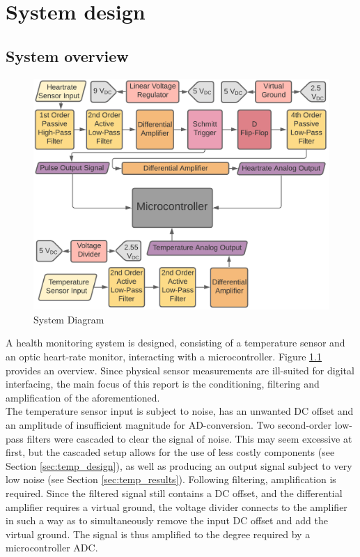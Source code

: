 
\chapter{System design}
	\section{System overview} \label{sec:system}

\begin{figure}[h]
    \centering
    \vspace{-0.5cm}
    \includegraphics[width = 1\textwidth]{Figures/overview}
    \caption{System Diagram}
    \label{fig:overview}
\end{figure}

A health monitoring system is designed, consisting of a temperature sensor and an optic heart-rate monitor, interacting with a microcontroller. Figure \ref{fig:overview} provides an overview. Since physical sensor measurements are ill-suited for digital interfacing, the main focus of this report is the conditioning, filtering and amplification of the aforementioned.\\

The temperature sensor input is subject to noise, has an unwanted DC offset and an amplitude of insufficient magnitude for AD-conversion. Two second-order low-pass filters were cascaded to clear the signal of noise. This may seem excessive at first, but the cascaded setup allows for the use of less costly components (see Section \ref{sec:temp_design}), as well as producing an output signal subject to very low noise (see Section \ref{sec:temp_results}). Following filtering, amplification is required. Since the filtered signal still contains a DC offset, and the differential amplifier requires a virtual ground, the voltage divider connects to the amplifier in such a way as to simultaneously remove the input DC offset and add the virtual ground. The signal is thus amplified to the degree required by a microcontroller ADC.\\

